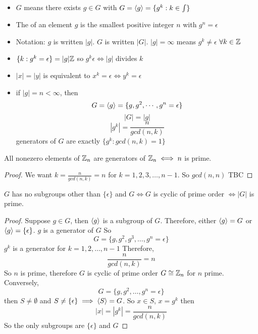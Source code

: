 \documentclass[openany]{report}
\begin{document}
\chapter{}
\begin{itemize}
    \item $G$  means there exists $g \in G$ with $G = \langle g \rangle = \{g^k : k \in \int\}$
    \item The  of an element $g$ is the smallest positive integer $n$ with $g^n = \epsilon$
    \item Notation:  $g$ is written $|g|$.  $G$ is written $|G|$. $|g| = \infty$ means $g^k \neq \epsilon$ $\forall k \in \mathbb{Z}$
    \item $\{k: g^k = \epsilon\} = |g|\mathbb{Z}$ so $g^k \epsilon \iff |g|$ divides $k$
    \item $|x| = |y|$ is equivalent to $x^k = \epsilon \iff y^k = \epsilon$
    \item if $|g| = n < \infty$, then
    $$G = \langle g \rangle = \{g,g^2,\cdots, g^n = \epsilon\}$$
    $$|G| = |g|$$
    $$|g^k| = \frac{n}{gcd(n,k)}$$
    generators of $G $ are exactly $\{g^k: gcd(n,k) = 1\}$
\end{itemize}
\begin{corollary}
    All nonezero elements of $\mathbb{Z}_n$ are generators of $\mathbb{Z}_n \iff n$ is prime.
\end{corollary}
\begin{proof}
    We want $k = \frac{n}{gcd(n,k)} = n$ for $k = 1,2,3,\dots, n-1$. So $gcd(n,n)$ TBC
\end{proof}
\begin{theorem}
    $G$ has no subgroups other than $ \{\epsilon\}$ and $G \iff G$ is cyclic of prime order $\iff |G|$ is prime. 
\end{theorem}
\begin{proof}
    Suppose $g \in G$, then $\langle g \rangle$ is a subgroup of $G$. Therefore, either $\langle g \rangle = G$ or $\langle g \rangle = \{\epsilon\}$. $g$ is a generator of $G$ 
    So 
    $$G = \{g,g^2,g^3, \dots, g^n = \epsilon\}$$
    $g^k$ is a generator for $k = 1,2, \dots, n-1$
    Therefore, 
    $$\frac{n}{gcd(n,k)} = n$$
    So $n$ is prime, therefore $G$ is cyclic of prime order $G \cong \mathbb{Z}_n$ for $n$ prime.\\[2ex]
    Conversely,
    $$G = \{g, g^2, \dots, g^n = \epsilon\}$$
    then $S \neq \emptyset$ and $S \neq \{\epsilon\} \implies \langle S \rangle = G$. So $x \in S$, $x = g^k$ then 
    $$|x| = |g^k| = \frac{n}{gcd(n,k)}$$
    So the only subgroups are $\{\epsilon\}$ and $G$
\end{proof}
\end{document}
